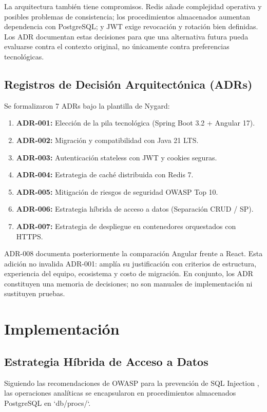 \documentclass[11pt,a4paper]{report}
\begin{document}
La arquitectura también tiene compromisos. Redis añade complejidad operativa y posibles problemas de consistencia; los procedimientos almacenados aumentan dependencia con PostgreSQL; y JWT exige revocación y rotación bien definidas. Los ADR documentan estas decisiones para que una alternativa futura pueda evaluarse contra el contexto original, no únicamente contra preferencias tecnológicas.

\section{Registros de Decisión Arquitectónica (ADRs)}
Se formalizaron 7 ADRs bajo la plantilla de Nygard:
\begin{enumerate}
    \item \textbf{ADR-001:} Elección de la pila tecnológica (Spring Boot 3.2 + Angular 17).
    \item \textbf{ADR-002:} Migración y compatibilidad con Java 21 LTS.
    \item \textbf{ADR-003:} Autenticación stateless con JWT y cookies seguras.
    \item \textbf{ADR-004:} Estrategia de caché distribuida con Redis 7.
    \item \textbf{ADR-005:} Mitigación de riesgos de seguridad OWASP Top 10.
    \item \textbf{ADR-006:} Estrategia híbrida de acceso a datos (Separación CRUD / SP).
    \item \textbf{ADR-007:} Estrategia de despliegue en contenedores orquestados con HTTPS.
\end{enumerate}

ADR-008 documenta posteriormente la comparación Angular frente a React. Esta adición no invalida ADR-001: amplía su justificación con criterios de estructura, experiencia del equipo, ecosistema y costo de migración. En conjunto, los ADR constituyen una memoria de decisiones; no son manuales de implementación ni sustituyen pruebas.

\chapter{Implementación}
\section{Estrategia Híbrida de Acceso a Datos}
Siguiendo las recomendaciones de OWASP para la prevención de SQL Injection \cite{owasp2021}, las operaciones analíticas se encapsularon en procedimientos almacenados PostgreSQL en `db/procs/`.
\end{document}
